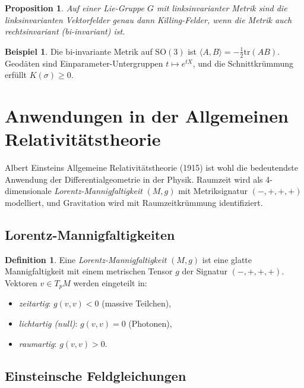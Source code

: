 \documentclass[12pt,a4paper]{amsart}
\newtheorem{proposition}[theorem]{Proposition}
\theoremstyle{definition}
\newtheorem{definition}[theorem]{Definition}
\newtheorem{beispiel}[theorem]{Beispiel}
\begin{document}
\begin{proposition}
Auf einer Lie-Gruppe $G$ mit linksinvarianter Metrik sind die linksinvarianten
Vektorfelder genau dann Killing-Felder, wenn die Metrik auch rechtsinvariant
(\emph{bi-invariant}) ist.
\end{proposition}

\begin{beispiel}
Die bi-invariante Metrik auf $\mathrm{SO}(3)$ ist $\langle A, B \rangle = -\tfrac{1}{2}\mathrm{tr}(AB)$.
Geodäten sind Einparameter-Untergruppen $t \mapsto e^{tX}$, und die
Schnittkrümmung erfüllt $K(\sigma) \geq 0$.
\end{beispiel}

\section{Anwendungen in der Allgemeinen Relativitätstheorie}
\label{sec:anwendungen}

Albert Einsteins Allgemeine Relativitätstheorie (1915) ist wohl die bedeutendste
Anwendung der Differentialgeometrie in der Physik. Raumzeit wird als
4-dimensionale \emph{Lorentz-Mannigfaltigkeit} $(M, g)$ mit Metriksignatur
$(-,+,+,+)$ modelliert, und Gravitation wird mit Raumzeitkrümmung identifiziert.

\subsection{Lorentz-Mannigfaltigkeiten}

\begin{definition}
Eine \emph{Lorentz-Mannigfaltigkeit} $(M, g)$ ist eine glatte Mannigfaltigkeit
mit einem metrischen Tensor $g$ der Signatur $(-,+,+,+)$. Vektoren
$v \in T_pM$ werden eingeteilt in:
\begin{itemize}
  \item \emph{zeitartig}: $g(v,v) < 0$ (massive Teilchen),
  \item \emph{lichtartig (null)}: $g(v,v) = 0$ (Photonen),
  \item \emph{raumartig}: $g(v,v) > 0$.
\end{itemize}
\end{definition}

\subsection{Einsteinsche Feldgleichungen}
\end{document}
